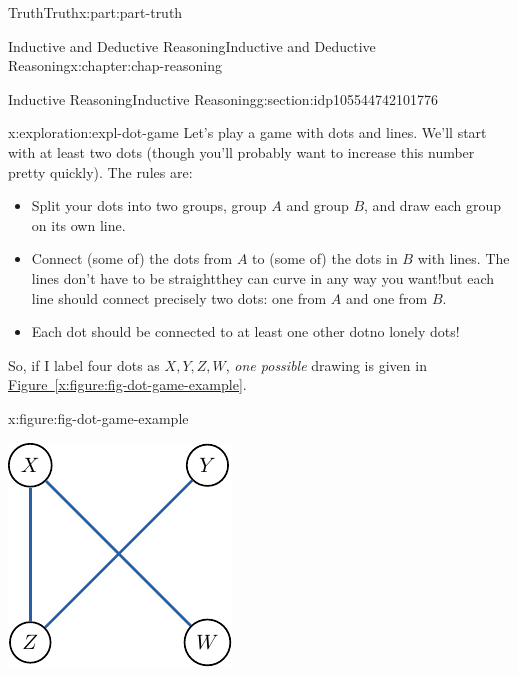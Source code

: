 \documentclass[oneside,10pt,]{book}
\newcommand{\xreffont}{\relax}
\numberwithin{equation}{section}
\begin{document}
\begin{partptx}{Truth}{}{Truth}{}{}{x:part:part-truth}
\begin{chapterptx}{Inductive and Deductive Reasoning}{}{Inductive and Deductive Reasoning}{}{}{x:chapter:chap-reasoning}
\begin{sectionptx}{Inductive Reasoning}{}{Inductive Reasoning}{}{}{g:section:idp105544742101776}
\begin{exploration}{}{x:exploration:expl-dot-game}
Let's play a game with dots and lines. We'll start with at least two dots (though you'll probably want to increase this number pretty quickly). The rules are:%
%
\begin{itemize}[label=\textbullet]
\item{}Split your dots into two groups, group \(A\) and group \(B\), and draw each group on its own line.%
\item{}Connect (some of) the dots from \(A\) to (some of) the dots in \(B\) with lines. The lines don't have to be straight\textemdash{}they can curve in any way you want!\textemdash{}but each line should connect precisely two dots: one from \(A\) and one from \(B\).%
\item{}Each dot should be connected to at least one other dot\textemdash{}no lonely dots!%
\end{itemize}
So, if I label four dots as \(X, Y, Z, W\), \emph{one possible} drawing is given in \hyperref[x:figure:fig-dot-game-example]{Figure~{\xreffont\ref{x:figure:fig-dot-game-example}}}.%
\begin{figureptx}{}{x:figure:fig-dot-game-example}{}%
\begin{image}{0.325}{0.35}{0.325}%
\includegraphics[width=\linewidth]{./images/dot-game-example.pdf}
\end{image}%
\tcblower
\end{figureptx}%

\end{exploration}
\end{sectionptx}
\end{chapterptx}
\end{partptx}
\end{document}
